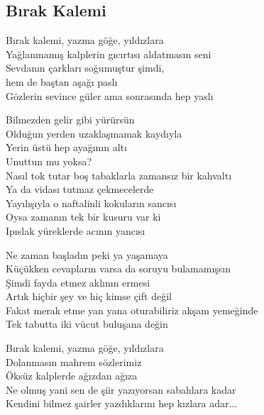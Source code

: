 \subsection{Bırak Kalemi}

Bırak kalemi, yazma göğe, yıldızlara \\
Yağlanmamış kalplerin gıcırtısı aldatmasın seni \\
Sevdanın çarkları soğumuştur şimdi, \\
hem de baştan aşağı paslı \\
Gözlerin sevince güler ama sonrasında hep yaslı

\noindent\newline
Bilmezden gelir gibi yürürsün \\
Olduğun yerden uzaklaşmamak kaydıyla \\
Yerin üstü hep ayağının altı \\
Unuttun mu yoksa? \\
Nasıl tok tutar boş tabaklarla zamansız bir kahvaltı \\
Ya da vidası tutmaz çekmecelerde \\
Yayılışıyla o naftalinli kokuların sancısı \\
Oysa zamanın tek bir kusuru var ki \\
Ipıslak yüreklerde acının yancısı

\noindent\newline
Ne zaman başladın peki ya yaşamaya \\
Küçükken cevapların varsa da soruyu bulamamışsın \\
Şimdi fayda etmez aklının ermesi \\
Artık hiçbir şey ve hiç kimse çift değil \\
Fakat merak etme yan yana oturabiliriz akşam yemeğinde \\
Tek tabutta iki vücut buluşana değin

\noindent\newline
Bırak kalemi, yazma göğe, yıldızlara \\
Dolanmasın mahrem sözlerimiz \\
Öksüz kalplerde ağızdan ağıza \\
Ne olmuş yani sen de şiir yazıyorsan sabahlara kadar \\
Kendini bilmez şairler yazdıklarını hep kızlara adar...